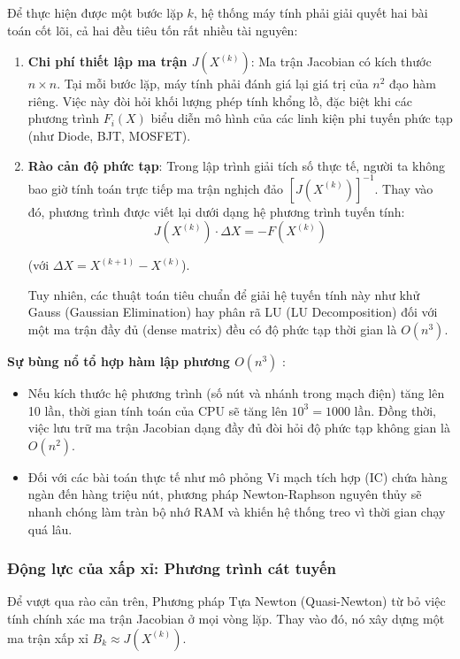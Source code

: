 Để thực hiện được một bước lặp $k$, hệ thống máy tính phải giải quyết hai bài toán cốt lõi, cả hai đều tiêu tốn rất nhiều tài nguyên:
\begin{enumerate}
    \item \textbf{Chi phí thiết lập ma trận $J(X^{(k)})$}: Ma trận Jacobian có kích thước $n \times n$. Tại mỗi bước lặp, máy tính phải đánh giá lại giá trị của $n^2$ đạo hàm riêng.
    Việc này đòi hỏi khối lượng phép tính khổng lồ, đặc biệt khi các phương trình $F_i(X)$ biểu diễn mô hình của các linh kiện phi tuyến phức tạp (như Diode, BJT, MOSFET).

    \item \textbf{Rào cản độ phức tạp}: Trong lập trình giải tích số thực tế, người ta không bao giờ tính toán trực tiếp ma trận nghịch đảo $[J(X^{(k)})]^{-1}$. Thay vào đó, phương trình được viết lại dưới dạng hệ phương trình tuyến tính:
    \[
J(X^{(k)}) \cdot \Delta X = -F(X^{(k)})
\]

(với $\Delta X = X^{(k+1)} - X^{(k)}$).

Tuy nhiên, các thuật toán tiêu chuẩn để giải hệ tuyến tính này như khử Gauss (Gaussian Elimination) hay phân rã LU (LU Decomposition) đối với một ma trận đầy đủ (dense matrix) đều có độ phức tạp thời gian là $O(n^3)$.
\end{enumerate}
\textbf{Sự bùng nổ tổ hợp hàm lập phương $O(n^3)$ }:
\begin{itemize}
    \item Nếu  kích thước hệ phương trình (số nút và nhánh trong mạch điện) tăng lên 10 lần, thời gian tính toán của CPU sẽ tăng lên $10^3 = 1000$ lần. Đồng thời, việc lưu trữ ma trận Jacobian dạng đầy đủ đòi hỏi độ phức tạp không gian là $O(n^2)$.
    \item Đối với các bài toán thực tế như mô phỏng Vi mạch tích hợp (IC) chứa hàng ngàn đến hàng triệu nút, phương pháp Newton-Raphson nguyên thủy sẽ nhanh chóng làm tràn bộ nhớ RAM và khiến hệ thống treo vì thời gian chạy quá lâu.
\end{itemize}

\subsubsection{Động lực của xấp xỉ: Phương trình cát tuyến}

Để vượt qua rào cản trên, Phương pháp Tựa Newton (Quasi-Newton) từ bỏ việc tính chính xác ma trận Jacobian ở mọi vòng lặp. Thay vào đó, nó xây dựng một ma trận xấp xỉ $B_k \approx J(X^{(k)})$.\\

